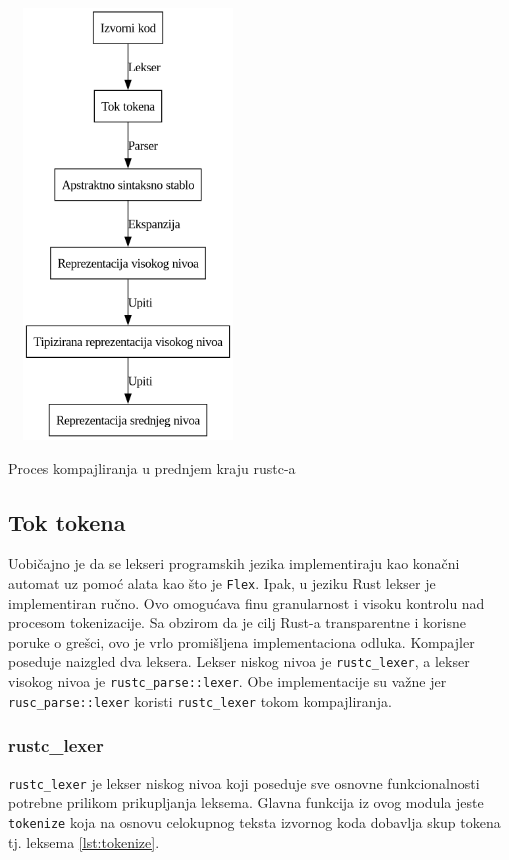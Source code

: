\documentclass[11pt]{article}
\begin{document}
\begin{listing}[H]
\begin{center}
\includegraphics[width=2.5in, height=4.5in]{compilation.png}
\end{center}
\caption{Proces kompajliranja u prednjem kraju rustc-a}
\label{lst:compiler}
\end{listing}

\subsection{Tok tokena}

Uobičajno je da se lekseri programskih jezika implementiraju kao konačni automat uz pomoć alata kao što je
\verb|Flex|. Ipak, u jeziku Rust lekser je implementiran ručno. Ovo omogućava finu granularnost i visoku 
kontrolu nad procesom tokenizacije. Sa obzirom da je cilj Rust-a transparentne i korisne poruke o 
grešci, ovo je vrlo promišljena implementaciona odluka.
Kompajler poseduje naizgled dva leksera. Lekser niskog nivoa je \verb|rustc_lexer|, a lekser visokog nivoa je \verb|rustc_parse::lexer|. 
Obe implementacije su važne jer \verb|rusc_parse::lexer| koristi \verb|rustc_lexer| tokom kompajliranja.

\subsubsection{rustc\_lexer}

\verb|rustc_lexer| je lekser niskog nivoa koji poseduje sve osnovne
funkcionalnosti potrebne prilikom prikupljanja leksema.
Glavna funkcija iz ovog modula jeste \verb|tokenize| koja na osnovu celokupnog teksta 
izvornog koda dobavlja skup tokena tj. leksema \ref{lst:tokenize}.
\end{document}
